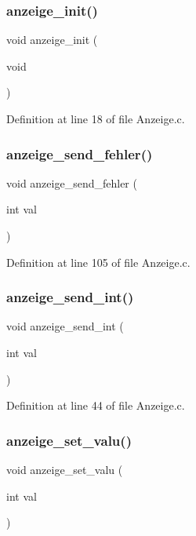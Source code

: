 \subsubsection{anzeige\+\_\+init()}
{\footnotesize\ttfamily void anzeige\+\_\+init (\begin{DoxyParamCaption}\item[{void}]{ }\end{DoxyParamCaption})}



Definition at line 18 of file Anzeige.\+c.

\mbox{\label{_anzeige_8c_ad5914a6aad33abad55477d32d2235947}} 
\subsubsection{anzeige\+\_\+send\+\_\+fehler()}
{\footnotesize\ttfamily void anzeige\+\_\+send\+\_\+fehler (\begin{DoxyParamCaption}\item[{int}]{val }\end{DoxyParamCaption})}



Definition at line 105 of file Anzeige.\+c.

\mbox{\label{_anzeige_8c_abd5892eb2cdbb10eb3cdb450a3753adc}} 
\subsubsection{anzeige\+\_\+send\+\_\+int()}
{\footnotesize\ttfamily void anzeige\+\_\+send\+\_\+int (\begin{DoxyParamCaption}\item[{int}]{val }\end{DoxyParamCaption})}



Definition at line 44 of file Anzeige.\+c.

\mbox{\label{_anzeige_8c_abec522a298bfc36eb7781353f177c4c4}} 
\subsubsection{anzeige\+\_\+set\+\_\+valu()}
{\footnotesize\ttfamily void anzeige\+\_\+set\+\_\+valu (\begin{DoxyParamCaption}\item[{int}]{val }\end{DoxyParamCaption})}




